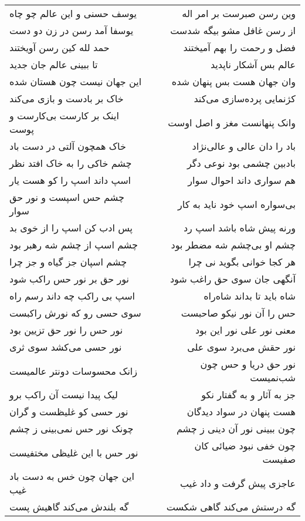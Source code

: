 \begin{center}
\begin{longtable}{l p{0.5cm} r}
\\
یوسف حسنی و این عالم چو چاه
&&
وین رسن صبرست بر امر اله
\\
یوسفا آمد رسن در زن دو دست
&&
از رسن غافل مشو بیگه شدست
\\
حمد لله کین رسن آویختند
&&
فضل و رحمت را بهم آمیختند
\\
تا ببینی عالم جان جدید
&&
عالم بس آشکار ناپدید
\\
این جهان نیست چون هستان شده
&&
وان جهان هست بس پنهان شده
\\
خاک بر بادست و بازی می‌کند
&&
کژنمایی پرده‌سازی می‌کند
\\
اینک بر کارست بی‌کارست و پوست
&&
وانک پنهانست مغز و اصل اوست
\\
خاک همچون آلتی در دست باد
&&
باد را دان عالی و عالی‌نژاد
\\
چشم خاکی را به خاک افتد نظر
&&
بادبین چشمی بود نوعی دگر
\\
اسپ داند اسپ را کو هست یار
&&
هم سواری داند احوال سوار
\\
چشم حس اسپست و نور حق سوار
&&
بی‌سواره اسپ خود ناید به کار
\\
پس ادب کن اسپ را از خوی بد
&&
ورنه پیش شاه باشد اسپ رد
\\
چشم اسپ از چشم شه رهبر بود
&&
چشم او بی‌چشم شه مضطر بود
\\
چشم اسپان جز گیاه و جز چرا
&&
هر کجا خوانی بگوید نی چرا
\\
نور حق بر نور حس راکب شود
&&
آنگهی جان سوی حق راغب شود
\\
اسپ بی راکب چه داند رسم راه
&&
شاه باید تا بداند شاه‌راه
\\
سوی حسی رو که نورش راکبست
&&
حس را آن نور نیکو صاحبست
\\
نور حس را نور حق تزیین بود
&&
معنی نور علی نور این بود
\\
نور حسی می‌کشد سوی ثری
&&
نور حقش می‌برد سوی علی
\\
زانک محسوسات دونتر عالمیست
&&
نور حق دریا و حس چون شب‌نمیست
\\
لیک پیدا نیست آن راکب برو
&&
جز به آثار و به گفتار نکو
\\
نور حسی کو غلیظست و گران
&&
هست پنهان در سواد دیدگان
\\
چونک نور حس نمی‌بینی ز چشم
&&
چون ببینی نور آن دینی ز چشم
\\
نور حس با این غلیظی مختفیست
&&
چون خفی نبود ضیائی کان صفیست
\\
این جهان چون خس به دست باد غیب
&&
عاجزی پیش گرفت و داد غیب
\\
گه بلندش می‌کند گاهیش پست
&&
گه درستش می‌کند گاهی شکست
\\

\end{longtable}
\end{center}
